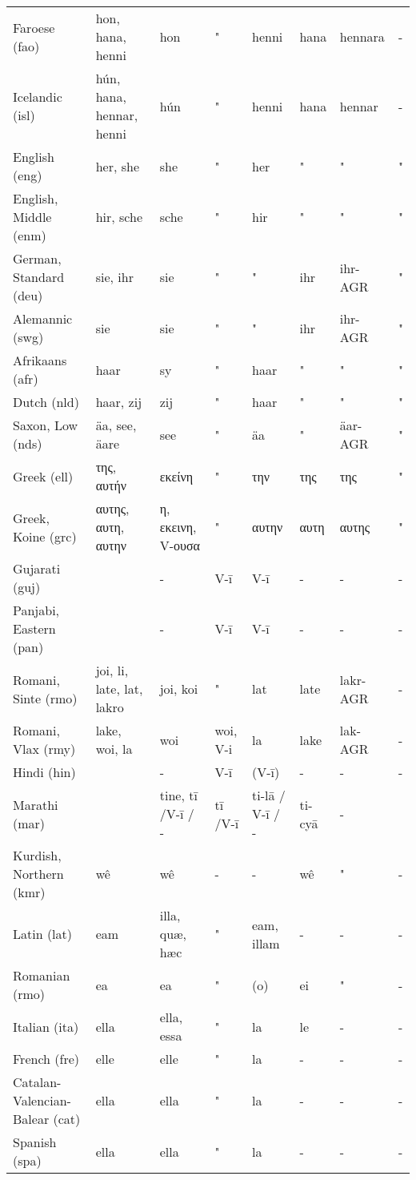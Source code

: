 \begin{landscape}
\begin{longtable}{*{8}{l}}
Faroese (fao)	&	hon, hana, henni	&	hon	&	"	&	henni	&	hana	&	hennara	&	 -	\\
Icelandic (isl)	&	hún, hana, hennar, {henni}	&	hún	&	"	&	henni	&	hana	&	hennar	&	 -	\\
English (eng)	&	her, she	&	she	&	"	&	her	&	"	&	"	&	"	\\
English, Middle (enm)	&	hir, sche	&	sche	&	"	&	hir	&	"	&	"	&	"	\\
German, Standard (deu)	&	sie, ihr	&	sie	&	"	&	"	&	ihr	&	ihr-AGR	&	"	\\
Alemannic (swg)	&	sie	&	sie	&	"	&	"	&	ihr	&	ihr-AGR	&	"	\\
Afrikaans (afr)	&	haar	&	sy	&	"	&	haar	&	"	&	"	&	"	\\
Dutch (nld)	&	haar, zij	&	zij	&	"	&	haar	&	"	&	"	&	"	\\
Saxon, Low (nds)	&	äa, see, äare	&	see	&	"	&	äa	&	"	&	äar-AGR	&	"	\\
Greek (ell)	&	της, {αυτήν}	&	εκείνη	&	"	&	την	&	της 	&	της	&	"	\\
Greek, Koine (grc)	&	αυτης, αυτη, αυτην	&	η, εκεινη, V-ουσα	&	"	&	αυτην 	&	αυτη 	&	αυτης	&	"	\\
Gujarati (guj)	&		&	 -	&	V-ī	&	V-ī	&	 -	&	 -	&	 -	\\
Panjabi, Eastern (pan)	&		&	 -	&	V-ī	&	V-ī	&	 -	&	 -	&	 -	\\
Romani, Sinte (rmo)	&	joi, li, late, lat, {lakro}	&	joi, koi	&	"	&	lat	&	late	&	lakr-AGR	&	 -	\\
Romani, Vlax (rmy)	&	lake, woi, la	&	woi	&	woi, V-i	&	la	&	lake	&	lak-AGR	&	 -	\\
Hindi (hin)	&		&	 -	&	V-ī	&	(V-ī)	&	 -	&	 -	&	 -	\\
Marathi (mar)	&\textdevanagari{तिला, ती, तिने}&	tine, tī /V-ī / -	&	tī /V-ī	&	ti-lā / V-ī / -	&	ti-cyā	&	 -	&		\\
Kurdish, Northern (kmr)	&	wê	&	wê	&	 -	&	 -	&	wê	&	"	&	 -	\\
Latin (lat)	&	eam	&	illa, quæ, hæc	&	"	&	eam, illam	&	 -	&	 -	&	 -	\\
Romanian (rmo)	&	ea	&	ea	&	"	&	(o)	&	ei	&	"	&	 -	\\
Italian (ita)	&	ella	&	ella, essa	&	"	&	la	&	 le	&	 -	&	 -	\\
French (fre)	&	elle	&	elle	&	"	&	la	&	 -	&	 -	&	 -	\\
Catalan-Valencian-Balear (cat)	&	ella	&	ella	&	"	&	la	&	 -	&	 -	&	 -	\\
Spanish (spa)	&	ella	&	ella	&	"	&	la	&	 -	&	 -	&	 -	\\

\end{longtable}
\end{landscape}
